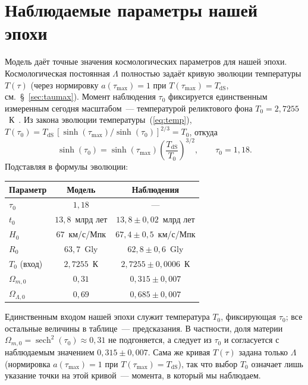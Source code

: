 \documentclass[12pt,a4paper]{article}
\begin{document}
\section{Наблюдаемые параметры нашей эпохи}

Модель даёт точные значения космологических параметров для нашей эпохи. Космологическая постоянная $\Lambda$ полностью задаёт кривую эволюции температуры $T(\tau)$ (через нормировку $a(\tau_{\max})=1$ при $T(\tau_{\max})=T_{\mathrm{dS}}$, см.~\S~\ref{sec:taumax}). Момент наблюдения $\tau_0$ фиксируется единственным измеренным сегодня масштабом~--- температурой реликтового фона $T_0 = 2{,}7255$~К~\cite{Planck2018}. Из закона эволюции температуры~(\ref{eq:temp}), $T(\tau_0) = T_{\mathrm{dS}}\,[\sinh(\tau_{\max})/\sinh(\tau_0)]^{2/3} = T_0$, откуда
\begin{equation}
\sinh(\tau_0) = \sinh(\tau_{\max})\left(\frac{T_{\mathrm{dS}}}{T_0}\right)^{3/2}, \qquad \tau_0 = 1{,}18.
\end{equation}
Подставляя в формулы эволюции:

\begin{center}
\begin{tabular}{l c c}
\hline
Параметр & Модель & Наблюдения \\
\hline
$\tau_0$ & $1{,}18$ & --- \\
$t_0$ & $13{,}8$~млрд лет & $13{,}8 \pm 0{,}02$~млрд лет \\
$H_0$ & $67$~км/с/Мпк & $67{,}4 \pm 0{,}5$~км/с/Мпк \\
$R_0$ & $63{,}7$~Gly & $62{,}8 \pm 0{,}6$~Gly \\
$T_0$ (вход) & $2{,}7255$~К & $2{,}7255 \pm 0{,}0006$~К \\
$\Omega_{m,0}$ & $0{,}31$ & $0{,}315 \pm 0{,}007$ \\
$\Omega_{\Lambda,0}$ & $0{,}69$ & $0{,}685 \pm 0{,}007$ \\
\hline
\end{tabular}
\end{center}

Единственным входом нашей эпохи служит температура $T_0$, фиксирующая $\tau_0$; все остальные величины в таблице~--- предсказания. В частности, доля материи $\Omega_{m,0} = \operatorname{sech}^2(\tau_0) \approx 0{,}31$ не подгоняется, а следует из $\tau_0$ и согласуется с наблюдаемым значением $0{,}315 \pm 0{,}007$. Сама же кривая $T(\tau)$ задана только $\Lambda$ (нормировка $a(\tau_{\max})=1$ при $T(\tau_{\max})=T_{\mathrm{dS}}$), так что выбор $T_0$ означает лишь указание точки на этой кривой~--- момента, в который мы наблюдаем.
\end{document}
